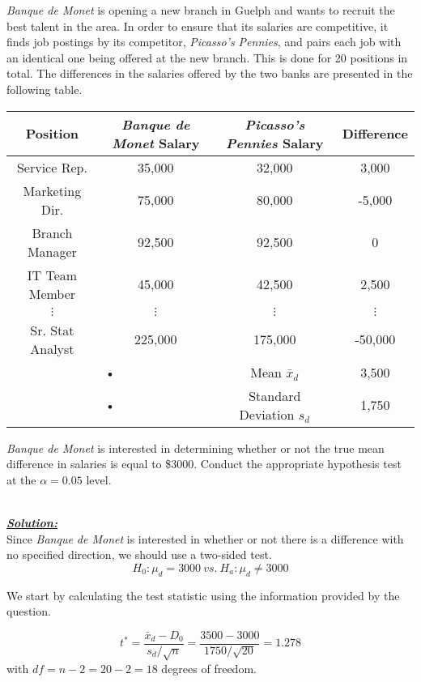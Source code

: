 \begin{example}
\textit{Banque de Monet} is opening a new branch in Guelph and wants to recruit the best talent in the area. In order to ensure that its salaries are competitive, it finds job postings by its competitor, \textit{Picasso's Pennies}, and pairs each job with an identical one being offered at the new branch. This is done for 20 positions in total. The differences in the salaries offered by the two banks are presented in the following table.
\begin{center}
\begin{tabular}{c|c|c|c}

Position & \textit{Banque de Monet} Salary & \textit{Picasso's Pennies} Salary & Difference \\ 
\hline 
Service Rep. & 35,000 & 32,000 & 3,000 \\ 
\hline 
Marketing Dir. & 75,000 & 80,000 & -5,000 \\ 
\hline 
Branch Manager & 92,500 & 92,500 & 0 \\ 
\hline 
IT Team Member & 45,000 & 42,500 & 2,500 \\ 
\hline 
$\vdots$ & $\vdots$ & $\vdots$ & $\vdots$ \\ 
\hline 
Sr. Stat Analyst & 225,000 & 175,000 & -50,000 \\ 
\hline 
\multicolumn{2}{c}{•} & Mean $\bar{x}_d$ & 3,500 \\ 

\multicolumn{2}{c}{•} & Standard Deviation $s_d$ & 1,750 \\ 
\end{tabular} 
\end{center}

\textit{Banque de Monet} is interested in determining whether or not the true mean difference in salaries is equal to \$3000. Conduct the appropriate hypothesis test at the $\alpha=0.05$ level.


\hfill\\
{\emph{\textbf{\underline{Solution:}}}}\\

Since \textit{Banque de Monet} is interested in whether or not there is a difference with no specified direction, we should use a two-sided test.
\[ H_0 : \mu_d =3000 ~vs.~ H_a : \mu_d \neq 3000 \]

We start by calculating the test statistic using the information provided by the question. 

\[ t^{*} = \frac{ \bar{x}_d - D_0}{s_d/\sqrt{n}} = \frac{3500-3000}{1750/\sqrt{20}} = 1.278 \]
with $df=n-2=20-2=18$ degrees of freedom.


\end{example}
